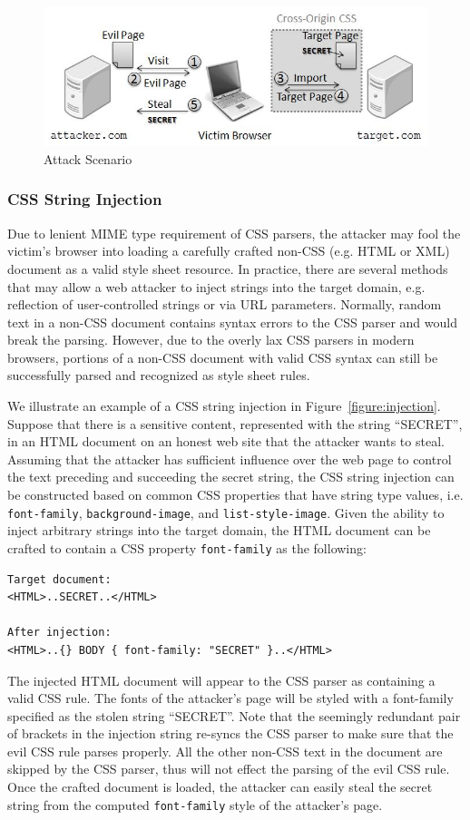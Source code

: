 \documentclass{acm_proc_article-sp}
\begin{document}
\begin{figure}
\centering
\includegraphics[width=\linewidth]{scenario.jpg}
\caption{Attack Scenario}
\label{figure:scenario}
\end{figure}

\subsubsection{CSS String Injection}
Due to lenient MIME type requirement of CSS parsers, the attacker may fool the victim's browser into loading a carefully crafted non-CSS (e.g. HTML or XML) document as a valid style sheet resource. In practice, there are several methods that may allow a web attacker to inject strings into the target domain, e.g. reflection of user-controlled strings or via URL parameters. Normally, random text in a non-CSS document contains syntax errors to the CSS parser and would break the parsing. However, due to the overly lax CSS parsers in modern browsers, portions of a non-CSS document with valid CSS syntax can still be successfully parsed and recognized as style sheet rules.

We illustrate an example of a CSS string injection in Figure~\ref{figure:injection}. Suppose that there is a sensitive content, represented with the string ``SECRET'', in an HTML document on an honest web site that the attacker wants to steal. Assuming that the attacker has sufficient influence over the web page to control the text preceding and succeeding the secret string, the CSS string injection can be constructed based on common CSS properties that have string type values, i.e. \texttt{font-family}, \texttt{background-image}, and \texttt{list-style-image}. Given the ability to inject arbitrary strings into the target domain, the HTML document can be crafted to contain a CSS property \texttt{font-family} as the following:
\begin{verbatim}
Target document:
<HTML>..SECRET..</HTML>

After injection:
<HTML>..{} BODY { font-family: "SECRET" }..</HTML>
\end{verbatim}
The injected HTML document will appear to the CSS parser as containing a valid CSS rule. The fonts of the attacker's page will be styled with a font-family specified as the stolen string ``SECRET''. Note that the seemingly redundant pair of brackets in the injection string re-syncs the CSS parser to make sure that the evil CSS rule parses properly. All the other non-CSS text in the document are skipped by the CSS parser, thus will not effect the parsing of the evil CSS rule. Once the crafted document is loaded, the attacker can easily steal the secret string from the computed \texttt{font-family} style of the attacker's page.
\end{document}
